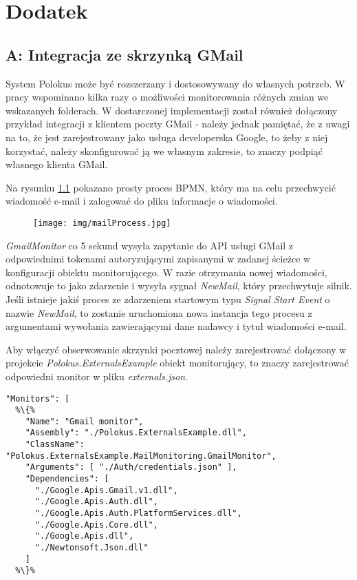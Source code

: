 \documentclass[declaration,shortabstract,mgr]{iithesis}
\newcommand{\bpmnnospace}{BPMN}
\begin{document}
\appendix
\setcounter{secnumdepth}{-1}
\chapter{Dodatek}
\section*{A: Integracja ze skrzynką GMail}

System Polokus może być rozszerzany i dostosowywany do własnych potrzeb. W pracy wspominano kilka razy o możliwości monitorowania różnych zmian we wskazanych folderach. W dostarczonej implementacji został również dołączony przykład integracji z klientem poczty GMail - należy jednak pamiętać, że z uwagi na to, że jest zarejestrowany jako usługa developerska Google, to żeby z niej korzystać, należy skonfigurować ją we własnym zakresie, to znaczy podpiąć własnego klienta GMail.

Na rysunku \ref{fig:mailProcess} pokazano prosty proces \bpmnnospace, który ma na celu przechwycić wiadomość e-mail i zalogować do pliku informacje o wiadomości.

\begin{figure}[H]
    \texttt{[image: img/mailProcess.jpg]}
    \caption{}
    \label{fig:mailProcess}
\end{figure}

\textit{GmailMonitor} co 5 sekund wysyła zapytanie do API usługi GMail z odpowiednimi tokenami autoryzującymi zapisanymi w zadanej ścieżce w konfiguracji obiektu monitorującego. W razie otrzymania nowej wiadomości, odnotowuje to jako zdarzenie i wysyła sygnał \textit{NewMail}, który przechwytuje silnik. Jeśli istnieje jakiś proces ze zdarzeniem startowym typu \textit{Signal Start Event} o nazwie \textit{NewMail}, to zostanie uruchomiona nowa instancja tego procesu z argumentami wywołania zawierającymi dane nadawcy i tytuł wiadomości e-mail.

\newpage
 Aby włączyć obserwowanie skrzynki pocztowej należy zarejestrować dołączony w projekcie \textit{Polokus.ExternalsExample} obiekt monitorujący, to znaczy zarejestrować odpowiedni monitor w pliku \textit{externals.json}.

\begin{minipage}[c]{\textwidth}
\centering
\begin{lstlisting}
"Monitors": [
  %\{%
    "Name": "Gmail monitor",
    "Assembly": "./Polokus.ExternalsExample.dll",
    "ClassName": "Polokus.ExternalsExample.MailMonitoring.GmailMonitor",
    "Arguments": [ "./Auth/credentials.json" ],
    "Dependencies": [
      "./Google.Apis.Gmail.v1.dll",
      "./Google.Apis.Auth.dll",
      "./Google.Apis.Auth.PlatformServices.dll",
      "./Google.Apis.Core.dll",
      "./Google.Apis.dll",
      "./Newtonsoft.Json.dll"
    ]
  %\}%			
  
\end{lstlisting}
\end{minipage}
\end{document}
